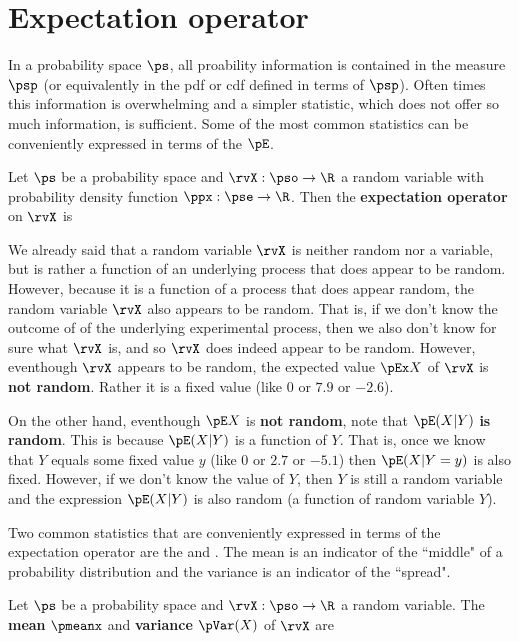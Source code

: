 \section{Expectation operator}
In a probability space $\ps$, all proability information
is contained in the measure $\psp$ (or equivalently in the pdf or cdf
defined in terms of $\psp$).
Often times this information is overwhelming and a simpler statistic,
which does not offer so much information, is sufficient.
Some of the most common statistics can be conveniently expressed in terms
of the  $\pE$.
\begin{definition}
Let $\ps$ be a probability space and
$\rvX:\pso\to\R$ a random variable with
probability density function $\ppx:\pse\to\R$.
Then the {\bf expectation operator} on $\rvX$ is
\end{definition}

We already said that a random variable $\rvX$ is neither random nor a variable,
but is rather a function of an underlying process that does appear to be random.
However, because it is a function of a process that does appear random,
the random variable $\rvX$ also appears to be random.
That is, if we don't know the outcome of of the underlying experimental
process, then we also don't know for sure what $\rvX$ is, and so $\rvX$ does
indeed appear to be random.
However, eventhough $\rvX$ appears to be random,
the expected value $\pEx X$  of $\rvX$ is {\bf not random}.
Rather it is a fixed value (like $0$ or $7.9$ or $-2.6$).

On the other hand, eventhough $\pE X$ is {\bf not random},
note that $\pE(X|Y)$ {\bf is random}.
This is because $\pE(X|Y)$ is a function of $Y$.
That is, once we know that $Y$ equals some fixed value $y$
(like $0$ or $2.7$ or $-5.1$) then $\pE(X|Y=y)$ is also fixed.
However, if we don't know the value of $Y$,
then $Y$ is still a random variable and the expression $\pE(X|Y)$
is also random (a function of random variable $Y$).

Two common statistics that are conveniently expressed in terms of the
expectation operator are the  and .
The mean is an indicator of the ``middle" of a probability distribution and the
variance is an indicator of the ``spread".
\begin{definition}
\label{def:Mx}
Let $\ps$ be a probability space and $\rvX:\pso\to\R$ a random variable.
The {\bf mean} $\pmeanx$ and {\bf variance} $\pVar(X)$ of $\rvX$ are
\end{definition}

